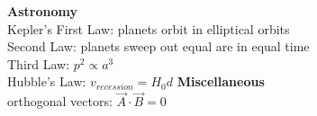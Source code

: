 \documentclass[12pt]{article}
\begin{document}
\begin{twocolumn}
\begin{flushleft}
\medskip
{\bf Astronomy} \\
Kepler's First Law: planets orbit in elliptical orbits \\
\medskip
Second Law:  planets sweep out equal are in equal time \\
\medskip
Third Law: $p^2 \propto  a^3 $ \\
\medskip
Hubble's Law: $v_{recession} = H_0 d$
\medskip
{ \bf Miscellaneous} \\
orthogonal vectors: $\vec{A} \cdot \vec{B} = 0$
\end{flushleft}
\end{twocolumn}
\end{document}
